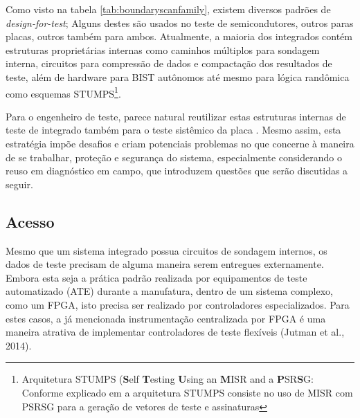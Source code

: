 Como visto na tabela \ref{tab:boundaryscanfamily}, existem diversos padrões de \textit{design-for-test}; Alguns destes são usados no teste de semicondutores, outros paras placas, outros também para ambos. Atualmente, a maioria dos integrados contém estruturas proprietárias internas como caminhos múltiplos para sondagem interna, circuitos para compressão de dados e compactação dos resultados de teste, além de hardware para BIST autônomos até mesmo para lógica randômica como esquemas STUMPS\footnote{Arquitetura STUMPS (\textbf{S}elf \textbf{T}esting \textbf{U}sing an \textbf{M}ISR and a \textbf{P}SR\textbf{S}G: Conforme explicado em \citet{larsson2006introduction} a arquitetura STUMPS consiste no uso de MISR com PSRSG para a geração de vetores de teste e assinaturas}\citep{bardell1987built, jutman2014high}. %

Para o engenheiro de teste, parece natural reutilizar estas estruturas internas de teste de integrado também para o teste sistêmico da placa \citep{vo2006design, qian2009logic}. Mesmo assim, esta estratégia impõe desafios e criam potenciais problemas no que concerne à maneira de se trabalhar, proteção e segurança do sistema, especialmente considerando o reuso em diagnóstico em campo, que introduzem questões que serão discutidas a seguir.

\subsection{Acesso}

Mesmo que um sistema integrado possua circuitos de sondagem internos, os dados de teste precisam de alguma maneira serem entregues externamente. Embora esta seja a prática padrão realizada por equipamentos de teste automatizado (ATE) durante a manufatura, dentro de um sistema complexo, como um FPGA, isto precisa ser realizado por controladores especializados. Para estes casos, a já mencionada instrumentação centralizada por FPGA é uma maneira atrativa de implementar controladores de teste flexíveis (Jutman et al., 2014).

